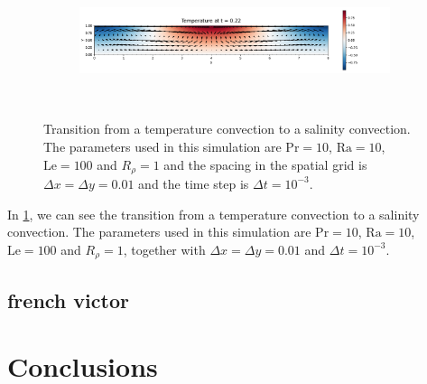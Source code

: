 \documentclass{article}
\def\Ra{\mathrm{Ra}}
\def\Pr{\mathrm{Pr}}
\def\Le{\mathrm{Le}}
\begin{document}
\begin{figure}[ht]
\begin{subfigure}{\textwidth}
  \end{subfigure}\\
  \begin{subfigure}{\textwidth}
    \centering
    \includegraphics[width=\textwidth]{images/TS_6.pdf}
  \end{subfigure}\\
  \caption{Transition from a temperature convection to a salinity convection. The parameters used in this simulation are $\Pr = 10$, $\Ra = 10$, $\Le = 100$ and $R_{\rho} = 1$ and the spacing in the spatial grid is $\Delta x = \Delta y = 0.01$ and the time step is $\Delta t = 10^{-3}$.}
  \label{fig:changeTS}
\end{figure}

In \cref{fig:changeTS}, we can see the transition from a temperature convection to a salinity convection. The parameters used in this simulation are $\Pr = 10$, $\Ra = 10$, $\Le = 100$ and $R_{\rho} = 1$, together with $\Delta x = \Delta y = 0.01$ and $\Delta t = 10^{-3}$.

\subsection{french victor}

\section{Conclusions}
\end{document}
